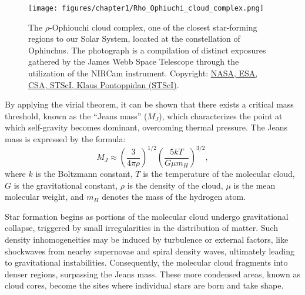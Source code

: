 \documentclass[main.tex]{subfiles}
\begin{document}
    \begin{figure}[t]
        \centering
        \texttt{[image: figures/chapter1/Rho\_Ophiuchi\_cloud\_complex.png]}
        \caption{The $\rho$-Ophiouchi cloud complex, one of the closest star-forming regions to our Solar System, located at the constellation of Ophiuchus. The photograph is a compilation of distinct exposures gathered by the James Webb Space Telescope through the utilization of the NIRCam instrument. Copyright: \href{https://webbtelescope.org/contents/media/images/2023/128/01H449193V5Q4Q6GFBKXAZ3S03}{NASA, ESA, CSA, STScI, Klaus Pontoppidan (STScI)}.}
        \label{fig:rho_ophiouchi}
    \end{figure}

    By applying the virial theorem, it can be shown that there exists a critical mass threshold, known as the ``Jeans mass'' ($M_J$), which characterizes the point at which self-gravity becomes dominant, overcoming thermal pressure. The Jeans mass is expressed by the formula:
    \begin{equation}\label{eq:jeans_mass}
        M_J \approx \left(\frac{3}{4\pi \rho}\right)^{1/2} \left(\frac{5kT}{G\mu m_H }\right)^{3/2}, 
    \end{equation}
    where $k$ is the Boltzmann constant, $T$ is the temperature of the molecular cloud, $G$ is the gravitational constant, $\rho$ is the density of the cloud, $\mu$ is the mean molecular weight, and $m_H$ denotes the mass of the hydrogen atom.

    Star formation begins as portions of the molecular cloud undergo gravitational collapse, triggered by small irregularities in the distribution of matter. Such density inhomogeneities may be induced by turbulence or external factors, like shockwaves from nearby supernovae and spiral density waves, ultimately leading to gravitational instabilities. Consequently, the molecular cloud fragments into denser regions, surpassing the Jeans mass. These more condensed areas, known as cloud cores, become the sites where individual stars are born and take shape.
\end{document}
